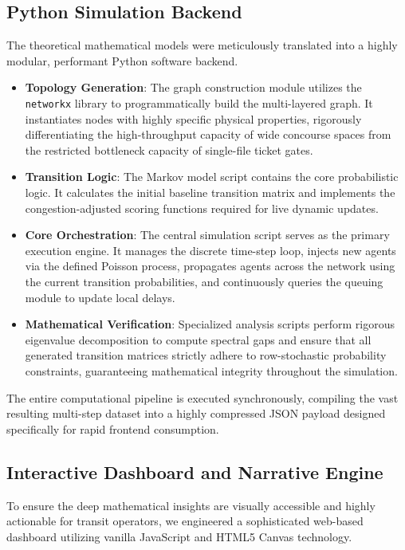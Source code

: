 \documentclass[conference]{IEEEtran}
\begin{document}
\subsection{Python Simulation Backend}
The theoretical mathematical models were meticulously translated into a highly modular, performant Python software backend.
\begin{itemize}
    \item \textbf{Topology Generation}: The graph construction module utilizes the \texttt{networkx} library to programmatically build the multi-layered graph. It instantiates nodes with highly specific physical properties, rigorously differentiating the high-throughput capacity of wide concourse spaces from the restricted bottleneck capacity of single-file ticket gates.
    \item \textbf{Transition Logic}: The Markov model script contains the core probabilistic logic. It calculates the initial baseline transition matrix and implements the congestion-adjusted scoring functions required for live dynamic updates.
    \item \textbf{Core Orchestration}: The central simulation script serves as the primary execution engine. It manages the discrete time-step loop, injects new agents via the defined Poisson process, propagates agents across the network using the current transition probabilities, and continuously queries the queuing module to update local delays.
    \item \textbf{Mathematical Verification}: Specialized analysis scripts perform rigorous eigenvalue decomposition to compute spectral gaps and ensure that all generated transition matrices strictly adhere to row-stochastic probability constraints, guaranteeing mathematical integrity throughout the simulation.
\end{itemize}
The entire computational pipeline is executed synchronously, compiling the vast resulting multi-step dataset into a highly compressed JSON payload designed specifically for rapid frontend consumption.

\subsection{Interactive Dashboard and Narrative Engine}
To ensure the deep mathematical insights are visually accessible and highly actionable for transit operators, we engineered a sophisticated web-based dashboard utilizing vanilla JavaScript and HTML5 Canvas technology.
\end{document}
